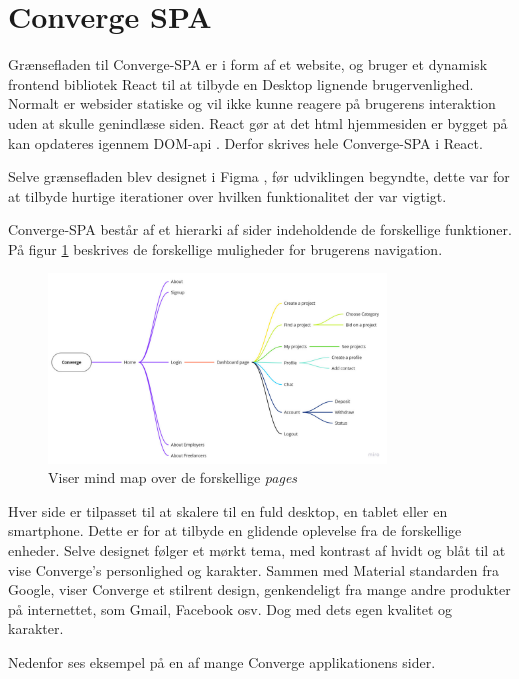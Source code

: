 \section{Converge SPA}
Grænsefladen til Converge-SPA er i form af et website, og bruger et dynamisk frontend bibliotek React til at tilbyde en Desktop lignende brugervenlighed. Normalt er websider statiske og vil ikke kunne reagere på brugerens interaktion uden at skulle genindlæse siden. React gør at det html hjemmesiden er bygget på kan opdateres igennem DOM-api \cite[Dom-API]{converge-terms}. Derfor skrives hele Converge-SPA i React. 

Selve grænsefladen blev designet i Figma \cite[Figma]{converge-terms}, før udviklingen begyndte, dette var for at tilbyde hurtige iterationer over hvilken funktionalitet der var vigtigt.

Converge-SPA består af et hierarki af sider indeholdende de forskellige funktioner. På figur \ref{fig:mindmap} beskrives de forskellige muligheder for brugerens navigation.

\begin{figure}[H]
    \centering
  \includegraphics[width=0.8\textwidth]{Billeder/Converge-Mind-Map.pdf}
  \caption{Viser mind map over de forskellige \emph{pages}}
  \label{fig:mindmap}
  \end{figure}

Hver side er tilpasset til at skalere til en fuld desktop, en tablet eller en smartphone. Dette er for at tilbyde en glidende oplevelse fra de forskellige enheder. Selve designet følger et mørkt tema, med kontrast af hvidt og blåt til at vise Converge’s personlighed og karakter. Sammen med Material standarden fra Google, viser Converge et stilrent design, genkendeligt fra mange andre produkter på internettet, som Gmail, Facebook osv. Dog med dets egen kvalitet og karakter.

Nedenfor ses eksempel på en af mange Converge applikationens sider.

